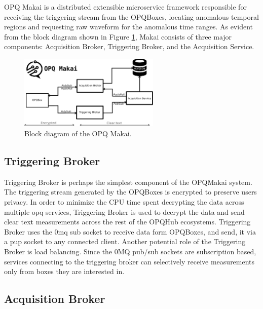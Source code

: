 OPQ Makai is a distributed extensible microservice framework responsible for receiving the triggering stream from the OPQBoxes, locating anomalous temporal regions and requesting raw waveform for the anomalous time ranges. As evident from the block diagram shown in Figure \ref{fig:7}, Makai consists of three major components: Acquisition Broker, Triggering Broker, and the Acquisition Service. 
\begin{figure}[h]
  \begin{center}
  \includegraphics[width=0.6\textwidth]{img/makai_main.pdf}
  \end{center}
  \caption{Block diagram of the OPQ Makai.}
  \label{fig:7}
\end{figure}

\subsection{Triggering Broker}

Triggering Broker is perhaps the simplest component of the OPQMakai system. The triggering stream generated by the OPQBoxes is encrypted to preserve users privacy. In order to minimize the CPU time spent decrypting the data across multiple opq services, Triggering Broker is used to decrypt the data and send clear text measurements across the rest of the OPQHub ecosystems. Triggering Broker uses the 0mq sub socket to receive data form OPQBoxes, and send, it via a pup socket to any connected client. Another potential role of the Triggering Broker is load balancing. Since the 0MQ pub/sub sockets are subscription based, services connecting to the triggering broker can selectively receive measurements only from boxes they are interested in. 

\subsection{Acquisition Broker}

